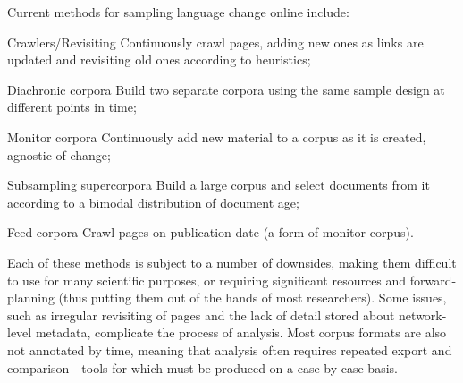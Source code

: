 Current methods for sampling language change online include:

\begin{itemizeTitle}

    \item[Crawlers/Revisiting] Continuously crawl pages, adding new ones as links are updated and revisiting old ones according to heuristics;
    \item[Diachronic corpora] Build two separate corpora using the same sample design at different points in time;
    \item[Monitor corpora] Continuously add new material to a corpus as it is created, agnostic of change;
    \item[Subsampling supercorpora] Build a large corpus and select documents from it according to a bimodal distribution of document age;
    \item[Feed corpora] Crawl pages on publication date (a form of monitor corpus).

\end{itemizeTitle}


Each of these methods is subject to a number of downsides, making them difficult to use for many scientific purposes, or requiring significant resources and forward-planning (thus putting them out of the hands of most researchers).  Some issues, such as irregular revisiting of pages and the lack of detail stored about network-level metadata, complicate the process of analysis.  Most corpus formats are also not annotated by time, meaning that analysis often requires repeated export and comparison---tools for which must be produced on a case-by-case basis.

% 
% 

